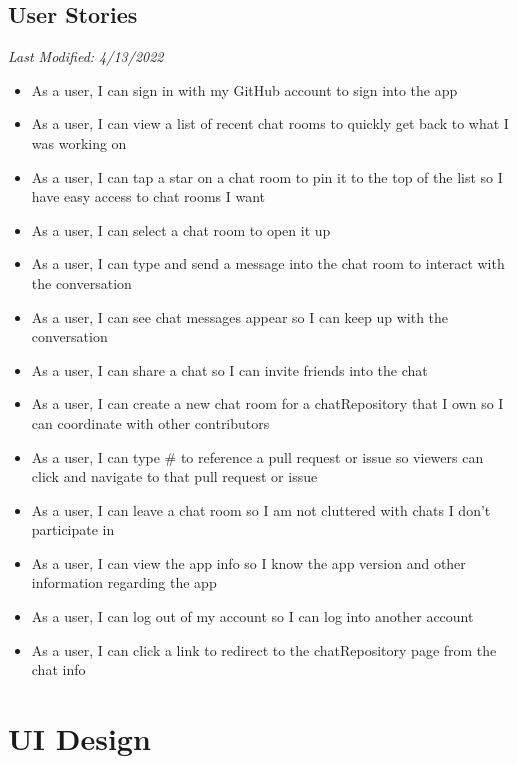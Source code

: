 \documentclass{report}
\begin{document}
\section{User Stories}
\textit{Last Modified: 4/13/2022}
\begin{itemize}
    \item As a user, I can sign in with my GitHub account to sign into the app
    \item As a user, I can view a list of recent chat rooms to quickly get back to what I was working on
    \item As a user, I can tap a star on a chat room to pin it to the top of the list so I have easy access to chat rooms I want
    \item As a user, I can select a chat room to open it up
    \item As a user, I can type and send a message into the chat room to interact with the conversation
    \item As a user, I can see chat messages appear so I can keep up with the conversation
    \item As a user, I can share a chat so I can invite friends into the chat
    \item As a user, I can create a new chat room for a chatRepository that I own so I can coordinate with other contributors
    \item As a user, I can type \# to reference a pull request or issue so viewers can click and navigate to that pull request or issue
    \item As a user, I can leave a chat room so I am not cluttered with chats I don't participate in
    \item As a user, I can view the app info so I know the app version and other information regarding the app
    \item As a user, I can log out of my account so I can log into another account
    \item As a user, I can click a link to redirect to the chatRepository page from the chat info
\end{itemize}

\chapter{UI Design}

\newpage
\end{document}
